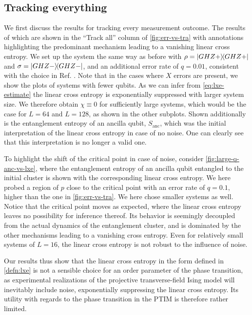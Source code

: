 \subsection{Tracking everything}

We first discuss the results for tracking every measurement outcome. The
results of which are shown in the \enquote{Track all} column of
\cref{fig:err-vs-tra} with annotations highlighting the predominant mechanism
leading to a vanishing linear cross entropy. We set up the system the same way
as before with $\rho = \dyad{GHZ+}$ and $\sigma = \dyad{GHZ-}$, and an
additional error rate of $q=0.01$, consistent with the choice in Ref.
\cite{tikhanovskayaUniversalityCrossEntropy2023}.
Note that in the cases where $X$
errors are present, we show the plots of systems with fewer qubits. As we can infer from
\cref{eq:lxe-estimate} the linear cross entropy is exponentially suppressed
with larger system size. We therefore obtain $\chi \equiv 0$ for sufficiently
large systems, which would be the case for $L=64$ and $L=128$, as shown in the
other subplots. Shown additionally is the entanglement entropy of an ancilla
qubit, $S_\mathrm{anc}$, which was the initial interpretation of the linear
cross entropy in case of no noise. One can clearly see that this interpretation
is no longer a valid one. 

To highlight the shift of the critical point in case
of noise, consider \cref{fig:large-q-anc-vs-lxe}, where the entanglement
entropy of an ancilla qubit entangled to the initial cluster is shown with 
the corresponding linear cross entropy. We here probed a region of $p$ close to
the critical point with an error rate of $q=0.1$, higher than the one in
\cref{fig:err-vs-tra}. We here chose smaller systems as well. Notice that the
critical point moves as expected, where the linear cross entropy leaves no
possibility for inference thereof. Its behavior is seemingly decoupled from the
actual dynamics of the entanglement cluster, and is dominated by the other
mechanisms leading to a vanishing cross entropy. Even for relatively small
systems of $L=16$, the linear cross entropy is not robust to the influence of
noise.

Our results thus show that the linear cross entropy in the form defined in
\cref{defn:lxe} is not a sensible choice for an order parameter of the phase
transition, as experimental realizations of the projective transverse-field
Ising model will inevitably include noise, exponentially suppressing the linear
cross entropy. Its utility with regards to the phase transition in the PTIM is
therefore rather limited.

